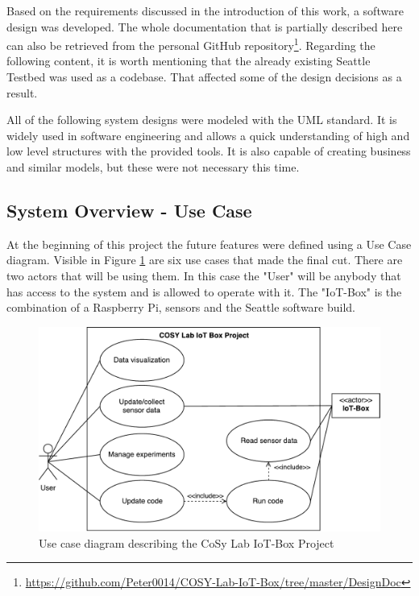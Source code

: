 \documentclass[bachelorthesis, grey, english]{mas-thesis-chapters} %
\begin{document}
Based on the requirements discussed in the introduction of this work, a software design was developed. The whole documentation that is partially described here can also be retrieved from the personal GitHub repository\footnote{ \url{https://github.com/Peter0014/COSY-Lab-IoT-Box/tree/master/DesignDoc}}. Regarding the following content, it is worth mentioning that the already existing Seattle Testbed \cite{seattleHomepage} was used as a codebase. That affected some of the design decisions as a result.

All of the following system designs were modeled with the \gls{UML} standard. It is widely used in software engineering and allows a quick understanding of high and low level structures with the provided tools. It is also capable of creating business and similar models, but these were not necessary this time. \cite{uml}

\subsection{System Overview - Use Case}

At the beginning of this project the future features were defined using a Use Case diagram. Visible in Figure \ref{fig:useCase} are six use cases that made the final cut. There are two actors that will be using them. In this case the "User" will be anybody that has access to the system and is allowed to operate with it. The "\gls{IoT}-Box" is the combination of a Raspberry Pi, sensors and the Seattle software build.

\begin{figure}[ht]
	\centering
	\includegraphics[width=13cm]{Use_Case_Diagram.pdf}
	\caption{Use case diagram describing the \gls{CoSy} Lab \gls{IoT}-Box Project}
	\label{fig:useCase}
\end{figure}
\end{document}
